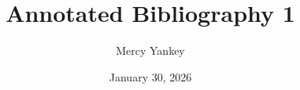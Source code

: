 \documentclass[12pt]{article}
\title{\textbf{Annotated Bibliography 1}}
\author{Mercy Yankey}
\date{January 30, 2026}
\begin{document}
\maketitle

\nocite{chan2025xr}
\nocite{dayanand2025irula}
\nocite{hug2025ai_literacy}



\end{document}
